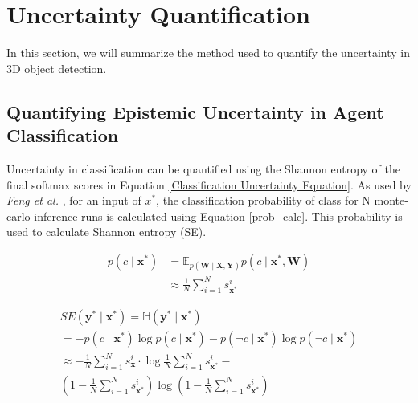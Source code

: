 \documentclass[10pt,twocolumn,letterpaper]{article}
\begin{document}
\section{Uncertainty Quantification}
In this section, we will summarize the method used to quantify the uncertainty in 3D object detection.
\subsection{Quantifying Epistemic Uncertainty in Agent Classification}
        \label{uncertainty in classification}
        Uncertainty in classification can be quantified using the Shannon entropy of the final softmax scores in Equation \ref{Classification Uncertainty Equation}. As used by \textit{Feng et al.} \cite{Feng2018}, for an input of $x^{*}$, the classification probability of class for N monte-carlo inference runs is calculated using Equation \ref{prob_calc}. This probability is used to calculate Shannon entropy (SE).

        \begin{equation}
            \label{prob_calc}
            \begin{aligned}
                p\left(c \mid \mathbf{x}^{*}\right) &=\mathbb{E}_{p(\mathbf{W} \mid \mathbf{X}, \mathbf{Y})} p\left(c \mid \mathbf{x}^{*}, \mathbf{W}\right) \\
                & \approx \frac{1}{N} \sum_{i=1}^{N} s_{\mathbf{x}^{*}}^{i}
            \end{aligned}
        \end{equation}
        
        \begin{equation}
            \label{Classification Uncertainty Equation}
            \begin{array}{l}
                S E\left(\mathbf{y}^{*} \mid \mathbf{x}^{*}\right)=\mathbb{H}\left(\mathbf{y}^{*} \mid \mathbf{x}^{*}\right) \\
                =-p\left(c \mid \mathbf{x}^{*}\right) \log p\left(c \mid \mathbf{x}^{*}\right)-p\left(\neg c \mid \mathbf{x}^{*}\right) \log p\left(\neg c \mid \mathbf{x}^{*}\right) \\
                \approx-\frac{1}{N} \sum_{i=1}^{N} s_{\mathbf{x}}^{i} \cdot \log \frac{1}{N} \sum_{i=1}^{N} s_{\mathbf{x}^{*}}^{i}- \\ \left(1-\frac{1}{N} \sum_{i=1}^{N} s_{\mathbf{x}^{*}}^{i}\right) \log \left(1-\frac{1}{N} \sum_{i=1}^{N} s_{\mathbf{x}^{*}}^{i}\right)
            \end{array}
        \end{equation}
        
\end{document}
